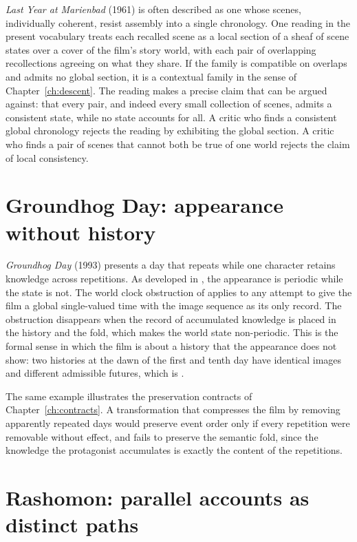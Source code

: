 \emph{Last Year at Marienbad} (1961) is often described as one whose scenes, individually coherent, resist assembly into a single chronology. One reading in the present vocabulary treats each recalled scene as a local section of a sheaf of scene states over a cover of the film's story world, with each pair of overlapping recollections agreeing on what they share. If the family is compatible on overlaps and admits no global section, it is a contextual family in the sense of Chapter~\ref{ch:descent}. The reading makes a precise claim that can be argued against: that every pair, and indeed every small collection of scenes, admits a consistent state, while no state accounts for all. A critic who finds a consistent global chronology rejects the reading by exhibiting the global section. A critic who finds a pair of scenes that cannot both be true of one world rejects the claim of local consistency.

\section{Groundhog Day: appearance without history}

\emph{Groundhog Day} (1993) presents a day that repeats while one character retains knowledge across repetitions. As developed in , the appearance is periodic while the state is not. The world clock obstruction of  applies to any attempt to give the film a global single-valued time with the image sequence as its only record. The obstruction disappears when the record of accumulated knowledge is placed in the history and the fold, which makes the world state non-periodic. This is the formal sense in which the film is about a history that the appearance does not show: two histories at the dawn of the first and tenth day have identical images and different admissible futures, which is .

The same example illustrates the preservation contracts of Chapter~\ref{ch:contracts}. A transformation that compresses the film by removing apparently repeated days would preserve event order only if every repetition were removable without effect, and fails to preserve the semantic fold, since the knowledge the protagonist accumulates is exactly the content of the repetitions.

\section{Rashomon: parallel accounts as distinct paths}

